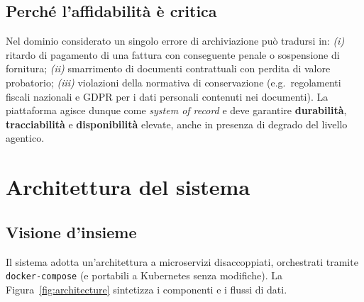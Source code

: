 \documentclass[11pt,a4paper,oneside]{article}
\begin{document}
\subsection{Perch\'e l'affidabilit\`a \`e critica}
Nel dominio considerato un singolo errore di archiviazione pu\`o tradursi in:
\emph{(i)} ritardo di pagamento di una fattura con conseguente penale o
sospensione di fornitura; \emph{(ii)} smarrimento di documenti contrattuali
con perdita di valore probatorio; \emph{(iii)} violazioni della normativa di
conservazione (e.g.\ regolamenti fiscali nazionali e GDPR per i dati personali
contenuti nei documenti). La piattaforma agisce dunque come \emph{system of
record} e deve garantire \textbf{durabilit\`a}, \textbf{tracciabilit\`a} e
\textbf{disponibilit\`a} elevate, anche in presenza di degrado del livello
agentico.

\section{Architettura del sistema}

\subsection{Visione d'insieme}
Il sistema adotta un'architettura a microservizi disaccoppiati, orchestrati
tramite \texttt{docker-compose} (e portabili a Kubernetes senza modifiche).
La Figura~\ref{fig:architecture} sintetizza i componenti e i flussi di dati.
\end{document}
